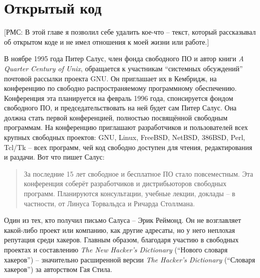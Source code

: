 

\chapter{Открытый код} \label{chapter:open source}

[РМС: В этой главе я позволил себе удалить кое-что -- текст, который рассказывал об открытом коде и не имел отношения к моей жизни или работе.]

В ноябре 1995 года Питер Салус, член фонда свободного ПО и автор книги \textit{A Quarter Century of Unix}, обращается к участникам \enquote{системных обсуждений} почтовой рассылки проекта GNU. Он приглашает их в Кембридж, на конференцию по свободно распространяемому программному обеспечению. Конференция эта планируется на февраль 1996 года, спонсируется фондом свободного ПО, и председательствовать на ней будет сам Питер Салус. Она должна стать первой конференцией, полностью посвящённой свободным программам. На конференцию приглашают разработчиков и пользователей всех крупных свободных проектов: GNU, Linux, FreeBSD, NetBSD, 386BSD, Perl, Tcl/Tk -- всех программ, чей код свободно доступен для чтения, редактирования и раздачи. Вот что пишет Салус:

\begin{quote}
За последние 15 лет свободное и бесплатное ПО стало повсеместным. Эта конференция соберёт разработчиков и дистрибьюторов свободных программ. Планируются консультации, учебные лекции, доклады -- в частности, от Линуса Торвальдса и Ричарда Столлмана.
\end{quote}

Один из тех, кто получил письмо Салуса -- Эрик Реймонд. Он не возглавляет какой-либо проект или компанию, как другие адресаты, но у него неплохая репутация среди хакеров. Главным образом, благодаря участию в свободных проектах и составлению \textit{The New Hacker's Dictionary} (\enquote{Нового словаря хакеров})  -- значительно расширенной версии \textit{The Hacker's Dictionary} (\enquote{Словаря хакеров}) за авторством Гая Стила.

